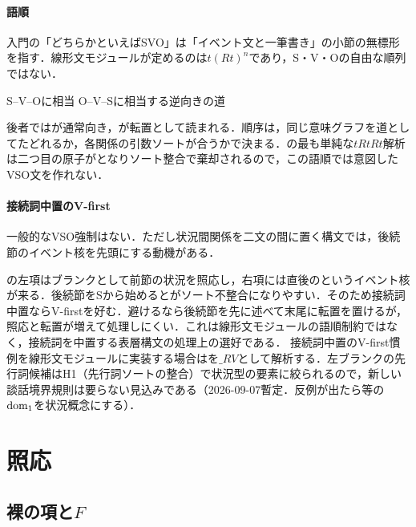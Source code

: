 \documentclass[../../main-detail.tex]{subfiles}
\begin{document}
\paragraph{語順}
入門の「どちらかといえばSVO」は「イベント文と一筆書き」の小節の無標形を指す．線形文モジュールが定めるのは$t(Rt)^n$であり，S・V・Oの自由な順列ではない．
\begin{exe}
    \ex {}\hfill S--V--Oに相当
    \ex {}\hfill O--V--Sに相当する逆向きの道
\end{exe}
後者ではが通常向き，が転置として読まれる．順序は，同じ意味グラフを道としてたどれるか，各関係の引数ソートが合うかで決まる．の最も単純な$tRtRt$解析は二つ目の原子がとなりソート整合で棄却されるので，この語順では意図したVSO文を作れない．

\paragraph{接続詞中置のV-first}
一般的なVSO強制はない．ただし状況間関係を二文の間に置く構文では，後続節のイベント核を先頭にする動機がある．
\begin{exe}
    \ex {}
    \glt {}
\end{exe}
の左項はブランクとして前節の状況を照応し，右項には直後のというイベント核が来る．後続節をSから始めるとがソート不整合になりやすい．そのため接続詞中置ならV-firstを好む．避けるなら後続節を先に述べて末尾に転置を置けるが，照応と転置が増えて処理しにくい．これは線形文モジュールの語順制約ではなく，接続詞を中置する表層構文の処理上の選好である．
接続詞中置のV-first慣例を線形文モジュールに実装する場合はを$\_RV$として解析する．左ブランクの先行詞候補はH1（先行詞ソートの整合）で状況型の要素に絞られるので，新しい談話境界規則は要らない見込みである（2026-09-07暫定．反例が出たら等の$\mathop{\mathrm{dom}}\nolimits_1$を状況概念にする）．

\section{照応}\label{sec:practice-anaphora}
\subsection{裸の項と$F$}
\end{document}

